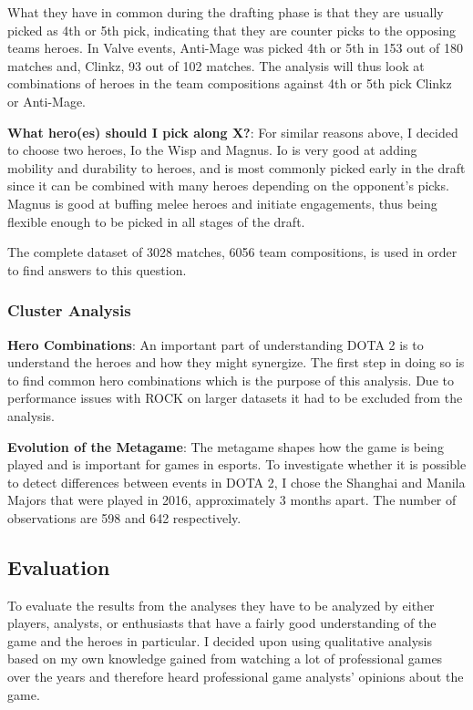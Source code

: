 \documentclass[report.tex]{subfiles}
\begin{document}
What they have in common during the drafting phase is that they are usually picked as 4th or 5th pick, indicating that they are counter picks to the opposing teams heroes. In Valve events, Anti-Mage was picked 4th or 5th in 153 out of 180 matches and, Clinkz, 93 out of 102 matches. The analysis will thus look at combinations of heroes in the team compositions against 4th or 5th pick Clinkz or Anti-Mage.

\textbf{What hero(es) should I pick along X?}: For similar reasons above, I decided to choose two heroes, Io the Wisp and Magnus. Io is very good at adding mobility and durability to heroes, and is most commonly picked early in the draft since it can be combined with many heroes depending on the opponent's picks. Magnus is good at buffing melee heroes and initiate engagements, thus being flexible enough to be picked in all stages of the draft.

The complete dataset of 3028 matches, 6056 team compositions, is used in order to find answers to this question.

\subsubsection*{Cluster Analysis}

\textbf{Hero Combinations}: An important part of understanding DOTA 2 is to understand the heroes and how they might synergize. The first step in doing so is to find common hero combinations which is the purpose of this analysis. Due to performance issues with ROCK on larger datasets it had to be excluded from the analysis.

\textbf{Evolution of the Metagame}: The metagame shapes how the game is being played and is important for games in esports. To investigate whether it is possible to detect differences between events in DOTA 2, I chose the Shanghai and Manila Majors that were played in 2016, approximately 3 months apart. The number of observations are 598 and 642 respectively.

\subsection*{Evaluation}

To evaluate the results from the analyses they have to be analyzed by either players, analysts, or enthusiasts that have a fairly good understanding of the game and the heroes in particular. I decided upon using qualitative analysis based on my own knowledge gained from watching a lot of professional games over the years and therefore heard professional game analysts' opinions about the game.
\end{document}
